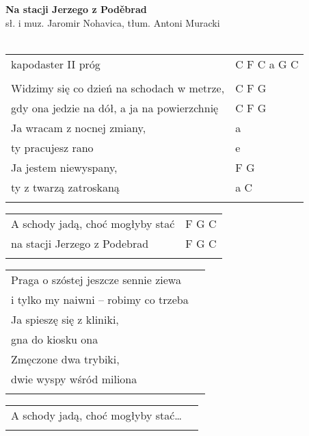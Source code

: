 \documentclass[a5paper]{article}
\begin{document}


\noindent
\fontsize{12pt}{15pt}\selectfont
\textbf{Na stacji Jerzego z Poděbrad} \\
\fontsize{8pt}{10pt}\selectfont
sł. i muz. Jaromir Nohavica, tłum. Antoni Muracki  \\ \\
\fontsize{10pt}{12pt}\selectfont
{}
\noindent
\begin{tabular}{@{}p{8.5cm}p{3cm}@{}}
kapodaster II próg & C F C  a G C \\ \\
Widzimy się co dzień na schodach w metrze, & C F G \\
gdy ona jedzie na dół, a ja na powierzchnię & C F G \\
Ja wracam z nocnej zmiany, & a \\
ty pracujesz rano & e \\
Ja jestem niewyspany, & F G \\
ty z twarzą zatroskaną & a C \\ \\
\end{tabular}
 
\noindent
\begin{tabular}{@{}p{7.5cm}p{3cm}@{}}
A schody jadą, choć mogłyby stać & F G C \\
na stacji Jerzego z Podebrad & F G C  \\ \\
\end{tabular}
 
\noindent
\begin{tabular}{@{}p{8.5cm}p{3cm}@{}}
Praga o szóstej jeszcze sennie ziewa\\
i tylko my naiwni – robimy co trzeba\\
Ja spieszę się z kliniki,\\
gna do kiosku ona\\
Zmęczone dwa trybiki,\\
dwie wyspy wśród miliona\\ \\
\end{tabular}
 
\noindent
\begin{tabular}{@{}p{8.5cm}p{3cm}@{}}
A schody jadą, choć mogłyby stać… \\ \\
\end{tabular}
 
\end{document}
